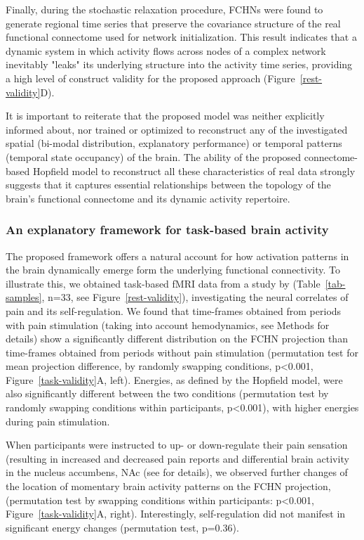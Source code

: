 \documentclass{article}
\begin{document}
Finally, during the stochastic relaxation procedure, FCHNs were found to generate regional time series that
preserve the covariance structure of the real functional connectome used for network initialization. This result indicates that a dynamic system in which activity flows across nodes of a complex network inevitably
"leaks" its underlying structure into the activity time series, providing a high level of construct validity for the proposed approach (Figure~\ref{rest-validity}D).

It is important to reiterate that the proposed model was neither explicitly informed about, nor trained or optimized to reconstruct any of the investigated spatial (bi-modal distribution, explanatory performance) or temporal patterns (temporal state occupancy) of the brain.
The ability of the proposed connectome-based Hopfield model to reconstruct all these characteristics of real data strongly suggests that it captures essential relationships between the topology of the brain's functional connectome and its dynamic activity repertoire.

\subsubsection{An explanatory framework for task-based brain activity}\label{An explanatory framework for task-based brain activity}

The proposed framework offers a natural account for how activation patterns in the brain dynamically emerge form the underlying functional connectivity. To illustrate this, we obtained task-based fMRI data from a study by
\citet{woo2015distinct} (Table~\ref{tab-samples}, n=33, see Figure~\ref{rest-validity}), investigating the neural
correlates of pain and its self-regulation.
We found that time-frames obtained from periods with pain stimulation (taking into account hemodynamics, see Methods for details) show a significantly different distribution on the FCHN projection than time-frames obtained from periods without pain stimulation (permutation test for mean projection difference, by randomly swapping conditions, p\textless 0.001, Figure~\ref{task-validity}A, left). Energies, as defined by the Hopfield model, were also significantly different between the two conditions (permutation test by randomly swapping conditions within participants, p\textless 0.001), with higher energies during pain stimulation.

When participants were instructed to up- or down-regulate their pain sensation (resulting in increased and decreased pain reports and differential brain activity in the nucleus accumbens, NAc (see \cite{woo2015distinct} for details), we observed further changes of the location of momentary brain activity patterns on the FCHN projection, (permutation test by swapping conditions within participants: p\textless 0.001, Figure~\ref{task-validity}A, right). Interestingly, self-regulation did not manifest in significant energy changes (permutation test, p=0.36).
\end{document}
